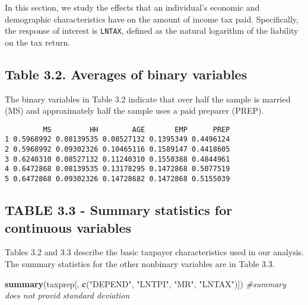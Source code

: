 \documentclass[]{book}
\newenvironment{Shaded}{\begin{snugshade}}{\end{snugshade}}
\newcommand{\CommentTok}[1]{\textcolor[rgb]{0.56,0.35,0.01}{\textit{#1}}}
\newcommand{\DataTypeTok}[1]{\textcolor[rgb]{0.13,0.29,0.53}{#1}}
\newcommand{\KeywordTok}[1]{\textcolor[rgb]{0.13,0.29,0.53}{\textbf{#1}}}
\newcommand{\NormalTok}[1]{#1}
\newcommand{\OperatorTok}[1]{\textcolor[rgb]{0.81,0.36,0.00}{\textbf{#1}}}
\newcommand{\StringTok}[1]{\textcolor[rgb]{0.31,0.60,0.02}{#1}}
\begin{document}
In this section, we study the effects that an individual's economic and demographic characteristics have on the amount of income tax paid. Specifically, the response of interest is \texttt{LNTAX}, defined as the natural logarithm of the liability on the tax return.

\hypertarget{table-3.2.-averages-of-binary-variables}{%
\subsection{Table 3.2. Averages of binary variables}\label{table-3.2.-averages-of-binary-variables}}

The binary variables in Table 3.2 indicate that over half the sample is married (MS) and approximately half the sample uses a paid preparer (PREP).

\begin{Shaded}
\end{Shaded}

\begin{verbatim}
         MS         HH        AGE       EMP      PREP
1 0.5968992 0.08139535 0.08527132 0.1395349 0.4496124
2 0.5968992 0.09302326 0.10465116 0.1589147 0.4418605
3 0.6240310 0.08527132 0.11240310 0.1550388 0.4844961
4 0.6472868 0.08139535 0.13178295 0.1472868 0.5077519
5 0.6472868 0.09302326 0.14728682 0.1472868 0.5155039
\end{verbatim}

\hypertarget{table-3.3---summary-statistics-for-continuous-variables}{%
\subsection{TABLE 3.3 - Summary statistics for continuous variables}\label{table-3.3---summary-statistics-for-continuous-variables}}

Tables 3.2 and 3.3 describe the basic taxpayer characteristics used in our analysis. The summary statistics for the other nonbinary variables are in Table 3.3.

\begin{Shaded}
\begin{Highlighting}[]
\KeywordTok{summary}\NormalTok{(taxprep[, }\KeywordTok{c}\NormalTok{(}\StringTok{"DEPEND"}\NormalTok{, }\StringTok{"LNTPI"}\NormalTok{, }\StringTok{"MR"}\NormalTok{, }\StringTok{"LNTAX"}\NormalTok{)]) }\CommentTok{#summary does not provid standard deviation}
\end{Highlighting}
\end{Shaded}
\end{document}

